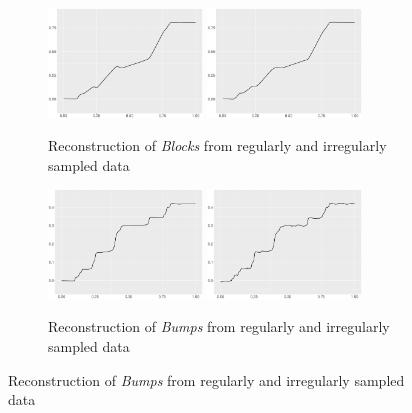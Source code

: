 \begin{figure}[!h]
    \centering
    \begin{subfigure}{\textwidth}
    \centering
    \includegraphics[width=0.45\textwidth]{Chapters/02TractorSplineTheory/plot/ggplot/ggblocksreg.pdf}
    \includegraphics[width=0.45\textwidth]{Chapters/02TractorSplineTheory/plot/ggplot/ggblocksire.pdf}
    \caption{Reconstruction of \textit{Blocks} from regularly and irregularly sampled data}
    \end{subfigure}
    \begin{subfigure}{\textwidth}
    \centering
    \includegraphics[width=0.45\textwidth]{Chapters/02TractorSplineTheory/plot/ggplot/ggbumpsreg.pdf}
    \includegraphics[width=0.45\textwidth]{Chapters/02TractorSplineTheory/plot/ggplot/ggbumpsire.pdf}
    \caption{Reconstruction of \textit{Bumps} from regularly and irregularly sampled data}

\end{subfigure}
\end{figure}
